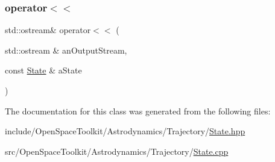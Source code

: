 \subsubsection{\texorpdfstring{operator$<$$<$}{operator<<}}
{\footnotesize\ttfamily std\+::ostream\& operator$<$$<$ (\begin{DoxyParamCaption}\item[{std\+::ostream \&}]{an\+Output\+Stream,  }\item[{const \hyperlink{classostk_1_1astro_1_1trajectory_1_1_state}{State} \&}]{a\+State }\end{DoxyParamCaption})\hspace{0.3cm}{\ttfamily [friend]}}



The documentation for this class was generated from the following files\+:\begin{DoxyCompactItemize}
\item 
include/\+Open\+Space\+Toolkit/\+Astrodynamics/\+Trajectory/\hyperlink{_trajectory_2_state_8hpp}{State.\+hpp}\item 
src/\+Open\+Space\+Toolkit/\+Astrodynamics/\+Trajectory/\hyperlink{_trajectory_2_state_8cpp}{State.\+cpp}\end{DoxyCompactItemize}
